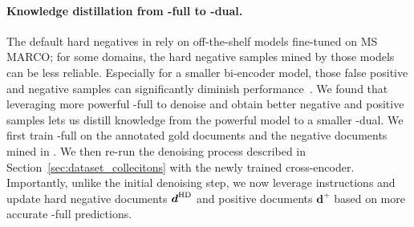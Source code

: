 \paragraph{{Knowledge distillation from \model-full to \model-dual.}}
{The default hard negatives in \rib rely on off-the-shelf models fine-tuned on MS MARCO; for some domains, the hard negative samples mined by those models can be less reliable. 
Especially for a smaller bi-encoder model, those false positive and negative samples can significantly diminish performance~\cite{qu-etal-2021-rocketqa}. 
We found that leveraging more powerful \model-full to denoise and obtain better negative and positive samples lets us distill knowledge from the powerful model to a smaller \model-dual.  
We first train \model-full on the annotated gold documents and the negative documents mined  
in \rib. }
We then re-run the denoising process described in Section~\ref{sec:dataset_collecitons} with the newly trained cross-encoder. 
Importantly, unlike the initial denoising step, we now leverage instructions and update hard negative documents $\boldsymbol{d}^{\rm HD}$ and positive documents  $\boldsymbol{d}^{+}$ based on more accurate \model-full predictions. 

